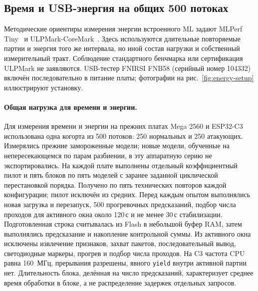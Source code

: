 \subsection{Время и USB-энергия на общих 500 потоках}
\label{sec:hw500}
Методические ориентиры измерения энергии встроенного ML задают MLPerf Tiny~\cite{Banbury2021MLPerfTiny} и ULPMark-CoreMark~\cite{EEMBCULPMarkCM}. Здесь используются длительные повторяемые партии и энергия того же интервала, но иной состав нагрузки и собственный измерительный тракт. Соблюдение стандартного бенчмарка или сертификация ULPMark не заявляются. USB-тестер FNIRSI FNB58 (серийный номер 104332) включён последовательно в питание платы; фотографии на рис.~\ref{fig:energy-setup} иллюстрируют установку.



\paragraph{Общая нагрузка для времени и энергии.}
Для измерения времени и энергии на прежних платах Mega 2560 и ESP32-C3 использована одна когорта из 500 потоков: 250 нормальных и 250 атакующих. Измерялись прежние замороженные модели; новые модели, обученные на непересекающемся по парам разбиении, в эту аппаратную серию не экспортировались. На каждой плате выполнены отдельный коэффициентный пилот и пять блоков по пять моделей с заранее заданной циклической перестановкой порядка. Получено по пять технических повторов каждой конфигурации; пилот исключён из средних. Перед каждым опытом выполнялись новая загрузка и перезапуск, 500 прогревочных предсказаний, подбор числа проходов для активного окна около 120\,с и не менее 30\,с стабилизации. Подготовленная строка считывалась из Flash в небольшой буфер RAM, затем выполнялись предсказание и накопление контрольной суммы. Из активного окна исключены извлечение признаков, захват пакетов, последовательный вывод, светодиодные маркеры, прогрев и подбор числа проходов. На C3 частота CPU равна 160~МГц, прерывания разрешены, явного \texttt{yield} внутри активной партии нет. Длительность блока, делённая на число предсказаний, характеризует среднее время обработки в блоке, а не распределение задержек отдельных запросов.

